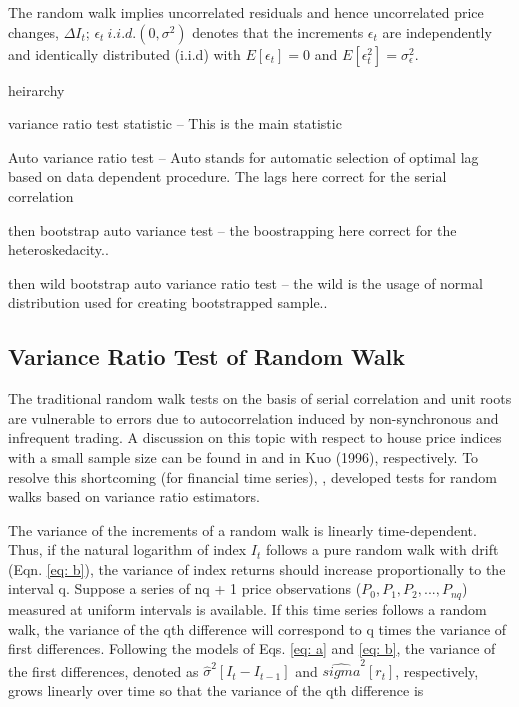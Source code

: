 \documentclass[AEJ,reqno, draftmode]{AEA}
\begin{document}
The random walk implies uncorrelated residuals and hence uncorrelated price changes, $\Delta I_t$; $\epsilon_t ~ i.i.d.(0, \sigma^2)$ denotes that the increments $\epsilon_t$ are independently and identically distributed (i.i.d) with $E[\epsilon_t] = 0$ and $E[\epsilon_t^2] = \sigma_\epsilon^2$.


            
            heirarchy
            
            variance ratio test statistic -- This is the main statistic
            
            Auto variance ratio test -- Auto stands for automatic selection of optimal lag based on data dependent procedure. The lags here correct for the serial correlation
            
            then bootstrap auto variance test -- the boostrapping here correct for the heteroskedacity..
            
            then wild bootstrap auto variance ratio test -- the wild is the usage of normal distribution used for creating bootstrapped sample..



\subsection{Variance Ratio Test of Random Walk}
            
The traditional random walk tests on the basis of serial correlation and unit roots are vulnerable to errors due to autocorrelation induced by non-synchronous and infrequent trading. A discussion on this topic with respect to house price indices with a small sample size can be found in \citet{karl1989efficiency} and in Kuo (1996), respectively. To resolve this shortcoming (for financial time series), \citep{lo1988stock}, \citep{lo1989size} developed tests for random walks based on variance ratio estimators.

The variance of the increments of a random walk is linearly time-dependent. Thus, if the natural logarithm of index $I_t$ follows a pure random walk with drift (Eqn. \eqref{eq: b}), the variance of index returns should increase proportionally to the interval q. Suppose a series of nq + 1 price observations ($P_0, P_1, P_2,...,P_{nq}$) measured at uniform intervals is available. If this time series follows a random walk, the variance of the qth difference will correspond to q times the variance of first differences. Following the models of Eqs. \eqref{eq: a} and \eqref{eq: b}, the variance of the first differences, denoted as $\hat{\sigma}^2[I_t - I_{t-1}]$ and $\hat{sigma}^2[r_t]$, respectively, grows linearly over time so that the variance of the qth difference is 
\end{document}
